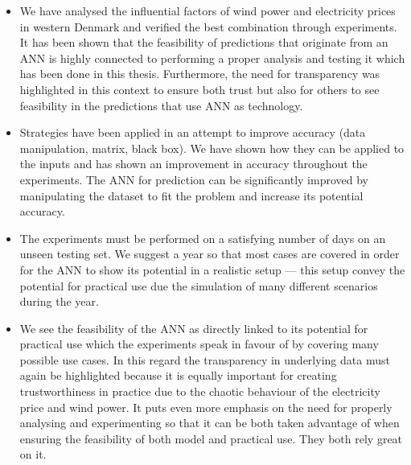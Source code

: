 \begin{itemize}
\item We have analysed the influential factors of wind power and electricity prices in western Denmark and verified the best combination through experiments. It has been shown that the feasibility of predictions that originate from an ANN is highly connected to performing a proper analysis and testing it which has been done in this thesis. Furthermore, the need for transparency was highlighted in this context to ensure both trust but also for others to see feasibility in the predictions that use ANN as technology.
\item Strategies have been applied in an attempt to improve accuracy (data manipulation, matrix, black box). We have shown how they can be applied to the inputs and has shown an improvement in accuracy throughout the experiments. The ANN for prediction can be significantly improved by manipulating the dataset to fit the problem and increase its potential accuracy.
\item The experiments must be performed on a satisfying number of days on an unseen testing set. We suggest a year so that most cases are covered in order for the ANN to show its potential in a realistic setup --- this setup convey the potential for practical use due the simulation of many different scenarios during the year. 
\item We see the feasibility of the ANN as directly linked to its potential for practical use which the experiments speak in favour of by covering many possible use cases. In this regard the transparency in underlying data must again be highlighted because it is equally important for creating trustworthiness in practice due to the chaotic behaviour of the electricity price and wind power. It puts even more emphasis on the need for properly analysing and experimenting so that it can be both taken advantage of when ensuring the feasibility of both model and practical use. They both rely great on it.  
\end{itemize}

